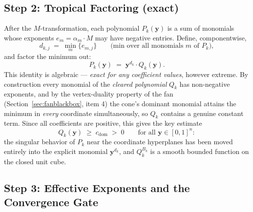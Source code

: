 \documentclass[11pt,a4paper]{article}
\begin{document}
\subsection{Step 2: Tropical Factoring (exact)}\label{sec:alg-factoring}

After the $M$-transformation, each polynomial $P_k(\mathbf{y})$ is a sum of
monomials whose exponents $e_{m} = \alpha_m \cdot M$ may have negative
entries. Define, componentwise,
\begin{equation}
d_{k,j} \;=\; \min_m \{e_{m,j}\} \qquad \text{(min over all monomials $m$ of $P_k$)},
\end{equation}
and factor the minimum out:
\begin{equation}
P_k(\mathbf{y}) \;=\; \mathbf{y}^{d_k} \cdot Q_k(\mathbf{y}).
\end{equation}
This identity is algebraic --- \emph{exact for any coefficient values}, however
extreme. By construction every monomial of the \emph{cleared polynomial}
$Q_k$ has non-negative exponents, and by the vertex-duality property of the
fan (Section~\ref{sec:fanblackbox}, item 4) the cone's dominant monomial
attains the minimum in \emph{every} coordinate simultaneously, so $Q_k$
contains a genuine constant term. Since all coefficients are positive, this
gives the key estimate
\begin{equation}
Q_k(\mathbf{y}) \;\geq\; c_{\mathrm{dom}} \;>\; 0
\qquad \text{for all } \mathbf{y} \in [0,1]^n :
\end{equation}
the singular behavior of $P_k$ near the coordinate hyperplanes has been moved
entirely into the explicit monomial $\mathbf{y}^{d_k}$, and $Q_k^{B_k}$ is a
smooth bounded function on the closed unit cube.

\subsection{Step 3: Effective Exponents and the Convergence Gate}\label{sec:alg-gate}
\end{document}
